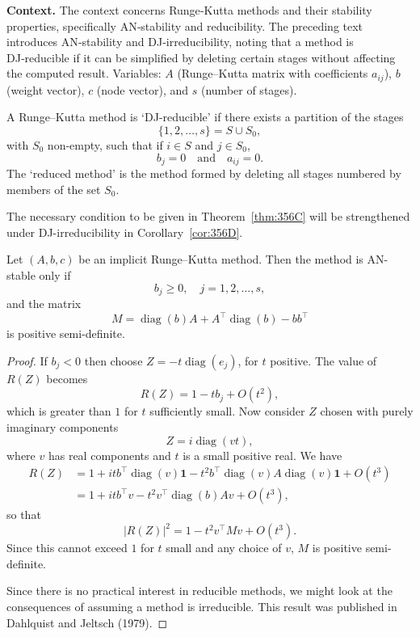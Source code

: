 \noindent\textbf{Context.}
The context concerns Runge‑Kutta methods and their stability properties, specifically AN‑stability and reducibility. The preceding text introduces AN‑stability and DJ‑irreducibility, noting that a method is DJ‑reducible if it can be simplified by deleting certain stages without affecting the computed result. Variables: $A$ (Runge–Kutta matrix with coefficients $a_{ij}$), $b$ (weight vector), $c$ (node vector), and $s$ (number of stages).

\begin{definition}

  \label{def:356B}
A Runge--Kutta method is `DJ-reducible' if there exists a partition of the stages
\[
\{1, 2, \dots, s\} = S \cup S_0,
\]
with $S_0$ non-empty, such that if $i \in S$ and $j \in S_0$,
\[
b_j = 0 \quad \text{and} \quad a_{ij} = 0.
\]
The `reduced method' is the method formed by deleting all stages numbered by members of the set $S_0$.

The necessary condition to be given in Theorem~\ref{thm:356C} will be strengthened under DJ-irreducibility in Corollary~\ref{cor:356D}.
\end{definition}

\begin{theorem}

  \label{thm:356C}
  \uses{}
Let $(A, b, c)$ be an implicit Runge--Kutta method. Then the method is AN-stable only if
\[
b_j \geq 0, \quad j = 1, 2, \dots, s,
\]
and the matrix
\[
M = \operatorname{diag}(b)A + A^\top \operatorname{diag}(b) - bb^\top
\]
is positive semi-definite.
\end{theorem}

\begin{proof}

If $b_j < 0$ then choose $Z = -t \operatorname{diag}(e_j)$, for $t$ positive. The value of $R(Z)$ becomes
\[
R(Z) = 1 - t b_j + O(t^2),
\]
which is greater than $1$ for $t$ sufficiently small. Now consider $Z$ chosen with purely imaginary components
\[
Z = i \operatorname{diag}(v t),
\]
where $v$ has real components and $t$ is a small positive real. We have
\begin{align*}
R(Z) &= 1 + i t b^\top \operatorname{diag}(v) \mathbf{1} - t^2 b^\top \operatorname{diag}(v) A \operatorname{diag}(v) \mathbf{1} + O(t^3) \\
&= 1 + i t b^\top v - t^2 v^\top \operatorname{diag}(b) A v + O(t^3),
\end{align*}
so that
\[
|R(Z)|^2 = 1 - t^2 v^\top M v + O(t^3).
\]
Since this cannot exceed $1$ for $t$ small and any choice of $v$, $M$ is positive semi-definite.

Since there is no practical interest in reducible methods, we might look at the consequences of assuming a method is irreducible. This result was published in Dahlquist and Jeltsch (1979).
\end{proof}

